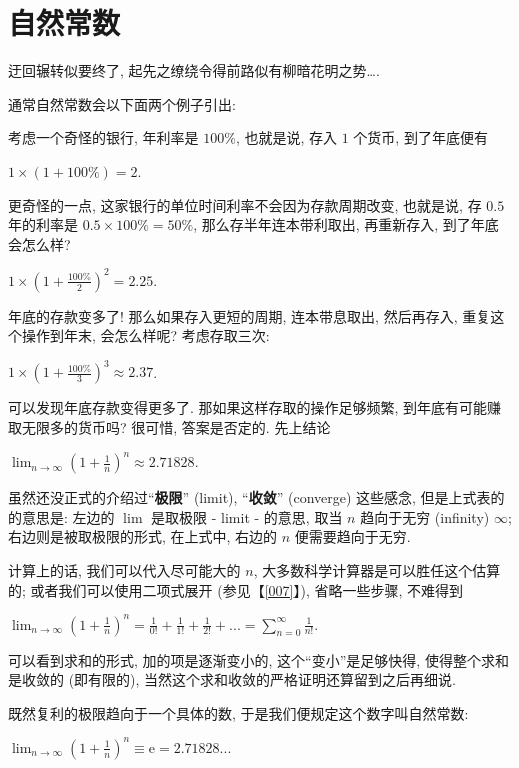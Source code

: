 \section{自然常数}\label{008}

\begin{flushright}{\kaishu 迂回辗转似要终了, 起先之缭绕令得前路似有柳暗花明之势\ldots.}\end{flushright}

通常自然常数会以下面两个例子引出:

\begin{tcolorbox}[size=fbox, breakable, enhanced jigsaw, title={复利}]

考虑一个奇怪的银行, 年利率是 $100\%$, 也就是说, 存入 $1$ 个货币,
到了年底便有

$1\times(1+100\%)=2.$

更奇怪的一点, 这家银行的单位时间利率不会因为存款周期改变, 也就是说, 存
$0.5$ 年的利率是 $0.5\times100\%=50\%$, 那么存半年连本带利取出,
再重新存入, 到了年底会怎么样?

$1\times\left(1+\frac{100\%}{2}\right)^2=2.25.$

年底的存款变多了! 那么如果存入更短的周期, 连本带息取出, 然后再存入,
重复这个操作到年末, 会怎么样呢? 考虑存取三次:

$1\times\left(1+\frac{100\%}{3}\right)^3\approx2.37$.

可以发现年底存款变得更多了. 那如果这样存取的操作足够频繁,
到年底有可能赚取无限多的货币吗? 很可惜, 答案是否定的. 先上结论

$\lim_{n\rightarrow\infty}\left(1+\frac{1}{n}\right)^n\approx2.71828.$

虽然还没正式的介绍过``\textbf{极限}'' (limit), ``\textbf{收敛}''
(converge) 这些感念, 但是上式表的的意思是: 左边的 $\lim$ 是取极限 -
limit - 的意思, 取当 $n$ 趋向于无穷 (infinity) $\infty$;
右边则是被取极限的形式, 在上式中, 右边的 $n$ 便需要趋向于无穷.

计算上的话, 我们可以代入尽可能大的 $n$,
大多数科学计算器是可以胜任这个估算的; 或者我们可以使用二项式展开
(参见【\ref{007}】), 省略一些步骤, 不难得到

$\lim_{n\rightarrow\infty}\left(1+\frac{1}{n}\right)^n=\frac{1}{0!}+\frac{1}{1!}+\frac{1}{2!}+...=\sum_{n=0}^\infty\frac{1}{n!}.$

可以看到求和的形式, 加的项是逐渐变小的, 这个``变小''是足够快得,
使得整个求和是收敛的 (即有限的),
当然这个求和收敛的严格证明还算留到之后再细说.

既然复利的极限趋向于一个具体的数, 于是我们便规定这个数字叫自然常数:

$\boxed{\lim_{n\rightarrow\infty}\left(1+\frac{1}{n}\right)^n\equiv\mathrm{e}=2.71828...}$

\end{tcolorbox}

